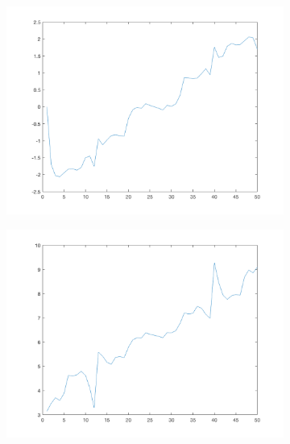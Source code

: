 \begin{figure}[htpb]
\centering
\begin{subfigure}{.25\textwidth}
\includegraphics[width=1\textwidth]{img/ProjXPCsigma0}
\end{subfigure}%
\begin{subfigure}{.25\textwidth}
\includegraphics[width=1\textwidth]{img/ProjXPCsigma75}
\end{subfigure}%
\begin{subfigure}{.25\textwidth}

\end{subfigure}
\end{figure}
